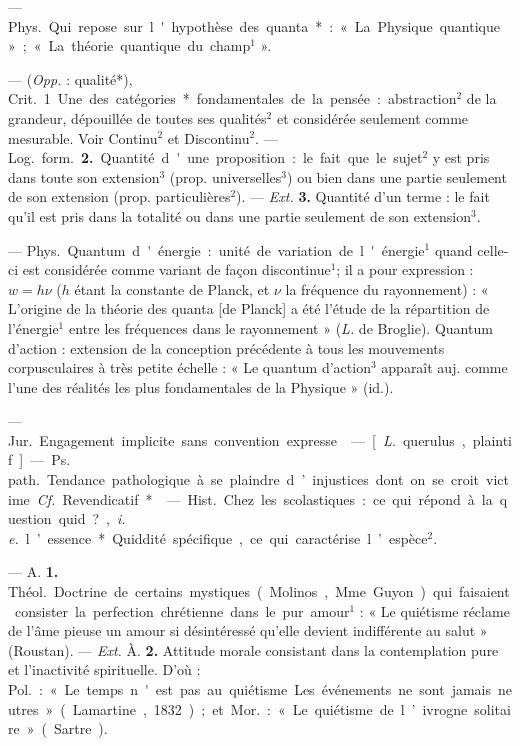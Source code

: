 \begin{itemize}[leftmargin=1cm, label=, itemsep=1pt]
 — \si{Phys.} Qui repose sur
l'hypothèse des quanta* : « La Physique quantique » ; « La théorie
quantique du champ$^1$ ».

 — ({\it Opp.} : qualité*), \si{Crit.}
1. Une des catégories* fondamentales de la pensée : abstraction$^2$ de
la grandeur, dépouillée de toutes
ses qualités$^2$ et considérée seulement
comme mesurable. Voir Continu$^2$ et
Discontinu$^2$. — \si{Log.} \si{form.} {\bf 2.} Quantité d'une proposition : le fait que le
sujet$^2$ y est pris dans toute son
extension$^3$ (prop. universelles$^3$) ou
bien dans une partie seulement de
son extension (prop. particulières$^2$).
— {\it Ext.} {\bf 3.} Quantité d'un terme : le
fait qu'il est pris dans la totalité ou
dans une partie seulement de son
extension$^3$.

 — \si{Phys.} Quantum d'énergie :
unité de variation de l'énergie$^1$
quand celle-ci est considérée comme
variant de façon discontinue$^1$; il a
pour expression : $ w = h \nu $ ($h$ étant
la constante de Planck, et $\nu$ la fréquence du rayonnement) : « L’origine de la théorie des quanta [de
Planck] a été l'étude de la répartition de l’énergie$^1$ entre les fréquences
dans le rayonnement » ({\it L.} de Broglie). Quantum d’action : extension
de la conception précédente à tous
les mouvements corpusculaires à
très petite échelle : « Le quantum
d'action$^3$ apparaît auj. comme l’une
des réalités les plus fondamentales
de la Physique » (id.).

 — \si{Jur.} Engagement
implicite sans convention expresse.

 — [{\it L.} querulus, plaintif]
— \si{Ps. path.} Tendance pathologique à se plaindre d’injustices dont
on se croit victime. {\it Cf.} Revendicatif*.

 — \si{Hist.} Chez les scolastiques :
ce qui répond à la question quid ?,
{\it i. e.} l’essence*. Quiddité spécifique,
ce qui caractérise l’espèce$^2$.

 — A. {\bf 1.} \si{Théol.} Doctrine
de certains mystiques (Molinos,
Mme Guyon) qui faisaient consister
la perfection chrétienne dans le pur
amour$^1$ : « Le quiétisme réclame de
l'âme pieuse un amour si désintéressé qu'elle devient indifférente
au salut » (Roustan). — {\it Ext.} À. {\bf 2.}
Attitude morale consistant dans la
contemplation pure et l'inactivité
spirituelle. D’où : \si{Pol.} : « Le temps
n'est pas au quiétisme... Les événements ne sont jamais neutres »
(Lamartine, 1832) ; et \si{Mor.} : « Le
quiétisme de l’ivrogne solitaire »
(Sartre).


\end{itemize}
